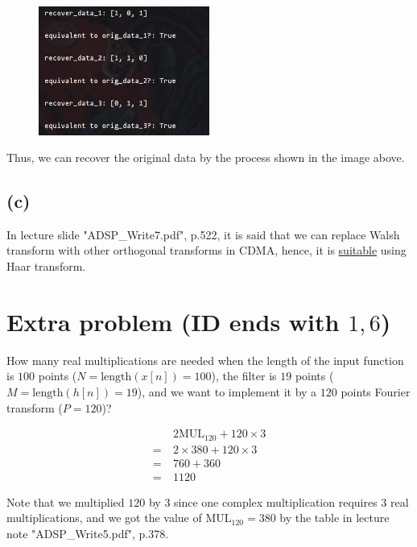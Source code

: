 \documentclass{article}
\begin{document}
\begin{figure}[H]
    \centering
    \includegraphics[width=0.5\textwidth]{HW5_img/7/recover_result.png}
\end{figure}

Thus, we can recover the original data by the process shown in the image above.

\subsection*{(c)}

In lecture slide "ADSP\_Write7.pdf", p.522, 
it is said that we can replace Walsh transform with other orthogonal transforms in CDMA, 
hence, it is \underline{suitable} using Haar transform.


\section*{Extra problem (ID ends with $1, 6$)}

How many real multiplications are needed 
when the length of the input function is $100$ points ($N = \mathrm{length}(x[n]) = 100$), 
the filter is $19$ points ($M = \mathrm{length}(h[n]) = 19$), 
and we want to implement it by a $120$ points Fourier transform ($P = 120$)?

\begin{align*}
    &2 \mathrm{MUL}_{120} + 120 \times 3 \\
    = \ & 2 \times 380 + 120 \times 3 \\
    = \ & 760 + 360 \\
    = \ & 1120
\end{align*}

Note that we multiplied $120$ by $3$ since one complex multiplication requires $3$ real multiplications, 
and we got the value of $\mathrm{MUL}_{120} = 380$ by the table in lecture note "ADSP\_Write5.pdf", p.378.
\end{document}
